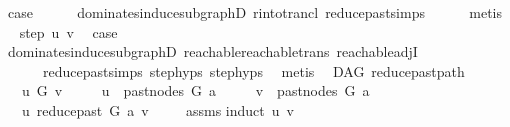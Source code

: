 \begin{isabellebody}
\ {\isacharquery}{\kern0pt}case\isanewline
\ \ \ \ \isamarkupfalse%
\ dominates{\isacharunderscore}{\kern0pt}induce{\isacharunderscore}{\kern0pt}subgraphD\ r{\isacharunderscore}{\kern0pt}into{\isacharunderscore}{\kern0pt}trancl{\isacharprime}{\kern0pt}\ reduce{\isacharunderscore}{\kern0pt}past{\isachardot}{\kern0pt}simps\isanewline
\ \ \ \ \isamarkupfalse%
\ metis\isanewline
{}\isamarkupfalse%
\ \isamarkupfalse%
\ {\isacharparenleft}{\kern0pt}step\ u\ v{\isacharparenright}{\kern0pt}\ \isamarkupfalse%
\ {\isacharquery}{\kern0pt}case\isanewline
\ \ \ \ \isamarkupfalse%
\ dominates{\isacharunderscore}{\kern0pt}induce{\isacharunderscore}{\kern0pt}subgraphD\ reachable{}{\isacharunderscore}{\kern0pt}reachable{\isacharunderscore}{\kern0pt}trans\ reachable{\isacharunderscore}{\kern0pt}adjI\ \isanewline
\ \ \ \ \ \ reduce{\isacharunderscore}{\kern0pt}past{\isachardot}{\kern0pt}simps\ step{\isachardot}{\kern0pt}hyps{\isacharparenleft}{\kern0pt}{}{\isacharparenright}{\kern0pt}\ step{\isachardot}{\kern0pt}hyps{\isacharparenleft}{\kern0pt}{}{\isacharparenright}{\kern0pt}\ \isamarkupfalse%
\ metis\isanewline
\isanewline
{}\isamarkupfalse%
%
\endisatagproof
{\isafoldproof}%
%
\isadelimproof
\isanewline
%
\endisadelimproof
\isanewline
{}\isamarkupfalse%
\ {\isacharparenleft}{\kern0pt}\ DAG{\isacharparenright}{\kern0pt}\ reduce{\isacharunderscore}{\kern0pt}past{\isacharunderscore}{\kern0pt}path{}{\isacharcolon}{\kern0pt}\isanewline
\ \ \ {\isachardoublequoteopen}u\ {\isasymrightarrow}\isactrlsup {\isacharplus}{\kern0pt}\isactrlbsub G\isactrlesub \ v{\isachardoublequoteclose}\isanewline
\ \ \ \ \ {\isachardoublequoteopen}u\ {\isasymin}\ past{\isacharunderscore}{\kern0pt}nodes\ G\ a{\isachardoublequoteclose}\isanewline
\ \ \ \ \ {\isachardoublequoteopen}v\ {\isasymin}\ past{\isacharunderscore}{\kern0pt}nodes\ G\ a{\isachardoublequoteclose}\isanewline
\ \ \ {\isachardoublequoteopen}u\ {\isasymrightarrow}\isactrlsup {\isacharplus}{\kern0pt}\isactrlbsub reduce{\isacharunderscore}{\kern0pt}past\ G\ a\isactrlesub \ v{\isachardoublequoteclose}\ \isanewline
%
\isadelimproof
\ \ %
\endisadelimproof
%
\isatagproof
{}\isamarkupfalse%
\ assms\isanewline
{}\isamarkupfalse%
{\isacharparenleft}{\kern0pt}induct\ u\ v{\isacharparenright}{\kern0pt}\isanewline
\ \ \isamarkupfalse%

\end{isabellebody}
